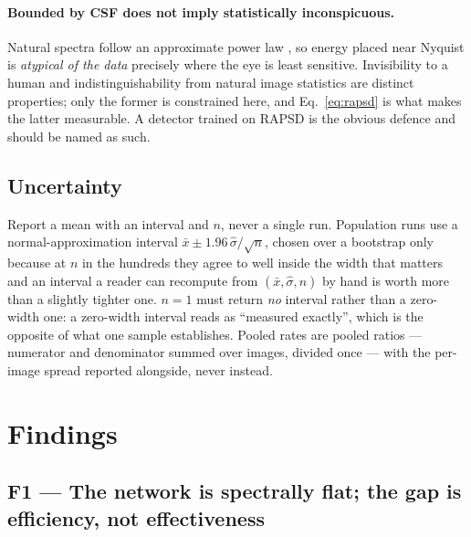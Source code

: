 \documentclass[11pt,a4paper]{article}
\begin{document}
\paragraph{Bounded by CSF does not imply statistically inconspicuous.}
Natural spectra follow an approximate power law
\citep{field1987,falck2025fourier,dieleman2024spectral}, so energy placed
near Nyquist is \emph{atypical of the data} precisely where the eye is least
sensitive. Invisibility to a human and indistinguishability from natural
image statistics are distinct properties; only the former is constrained
here, and Eq.~\eqref{eq:rapsd} is what makes the latter measurable. A
detector trained on RAPSD is the obvious defence and should be named as
such.

\subsection{Uncertainty}

Report a mean with an interval and $n$, never a single run. Population runs
use a normal-approximation interval
$\bar x \pm 1.96\,\hat\sigma/\sqrt{n}$, chosen over a bootstrap
\citep{efron1993bootstrap} only because at $n$ in the hundreds they agree to
well inside the width that matters and an interval a reader can recompute
from $(\bar x,\hat\sigma,n)$ by hand is worth more than a slightly tighter
one. $n=1$ must return \emph{no} interval rather than a zero-width one: a
zero-width interval reads as ``measured exactly'', which is the opposite of
what one sample establishes. Pooled rates are pooled ratios --- numerator
and denominator summed over images, divided once --- with the per-image
spread reported alongside, never instead.

\section{Findings}
\label{sec:findings}

\subsection{F1 --- The network is spectrally flat; the gap is efficiency,
not effectiveness}
\end{document}

